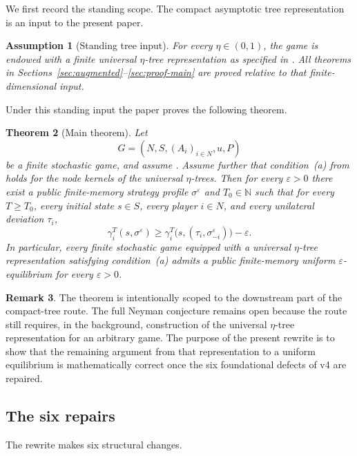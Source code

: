 \documentclass[12pt]{article}
\newtheorem{theorem}{Theorem}[section]
\newtheorem{assumption}[theorem]{Assumption}
\theoremstyle{definition}
\newtheorem{remark}[theorem]{Remark}
\newcommand{\eps}{\varepsilon}
\newcommand{\N}{\mathbb{N}}
\newcommand{\1}{\mathbf{1}}
\begin{document}
We first record the standing scope.  The compact asymptotic tree representation is
an input to the present paper.

\begin{assumption}[Standing tree input]
\label{ass:tree-input}
For every $\eta\in(0,1)$, the game is endowed with a finite universal
$\eta$-tree representation as specified in .  All theorems in
Sections~\ref{sec:augmented}--\ref{sec:proof-main} are proved relative to that
finite-dimensional input.
\end{assumption}

Under this standing input the paper proves the following theorem.

\begin{theorem}[Main theorem]
\label{thm:main}
Let
\[
G=(N,S,(A_i)_{i\in N},u,P)
\]
be a finite stochastic game, and assume .  Assume further
that condition~\textnormal{(a)} from  holds for the node kernels of
the universal $\eta$-trees.  Then for every $\eps>0$ there exist a public
finite-memory strategy profile $\sigma^\eps$ and $T_0\in\N$ such that for every
$T\ge T_0$, every initial state $s\in S$, every player $i\in N$, and every
unilateral deviation $\tau_i$,
\[
\gamma_i^T(s,\sigma^\eps)
\ge
\gamma_i^T\bigl(s,(\tau_i,\sigma^\eps_{-i})\bigr)-\eps.
\]
In particular, every finite stochastic game equipped with a universal
$\eta$-tree representation satisfying condition~\textnormal{(a)} admits a public
finite-memory uniform $\eps$-equilibrium for every $\eps>0$.
\end{theorem}

\begin{remark}
The theorem is intentionally scoped to the downstream part of the compact-tree
route.  The full Neyman conjecture remains open because the route still requires,
in the background, construction of the universal $\eta$-tree representation for an
arbitrary game.  The purpose of the present rewrite is to show that the remaining
argument from that representation to a uniform equilibrium is mathematically
correct once the six foundational defects of v4 are repaired.
\end{remark}

\subsection{The six repairs}

The rewrite makes six structural changes.
\end{document}
